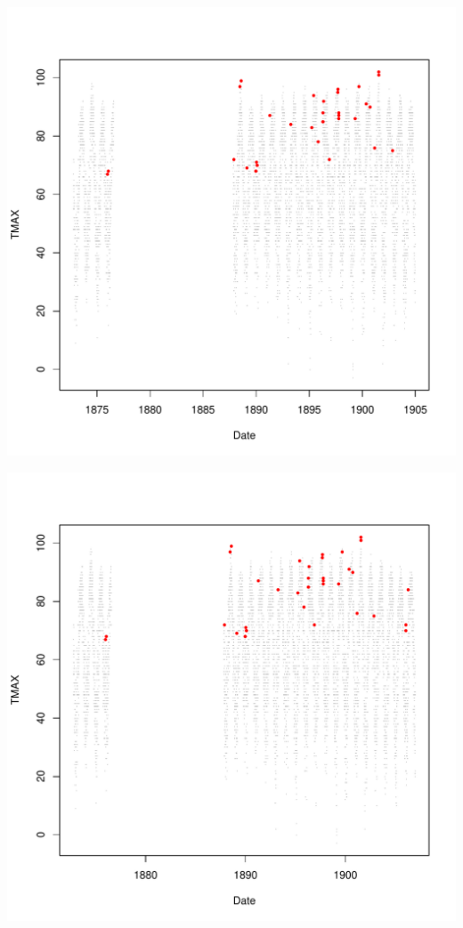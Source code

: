 \documentclass{article}\usepackage[]{graphicx}\usepackage[]{color}
\makeatletter
\def\maxwidth{ %
  \ifdim\Gin@nat@width>\linewidth
    \linewidth
  \else
    \Gin@nat@width
  \fi
}
\newenvironment{knitrout}{}{} %
\makeatother
\begin{document}
\begin{knitrout}
\includegraphics[width=\maxwidth]{figure/unnamed-chunk-4-12} 

\includegraphics[width=\maxwidth]{figure/unnamed-chunk-4-13} 


\end{knitrout}
\end{document}
